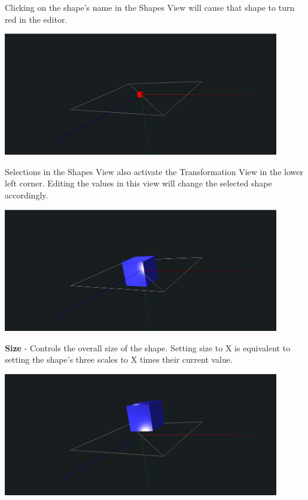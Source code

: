 Clicking on the shape's name in the Shapes View will cause that shape to turn
red in the editor.

\begin{center}
\includegraphics[width=12cm]{images/GeometrySelectCube.jpg}
\end{center}

Selections in the Shapes View also activate the Transformation View in the lower
left corner. Editing the values in this view will change the selected shape
accordingly.

\begin{center}
\includegraphics[width=12cm]{images/GeometryCubeSize.jpg}
\end{center}

\textbf{Size} - Controls the overall size of the shape. Setting size to X is
equivalent to setting the shape's three scales to X times their current value.

\begin{center}
\includegraphics[width=12cm]{images/GeometryCubeTranslate.jpg}
\end{center}

